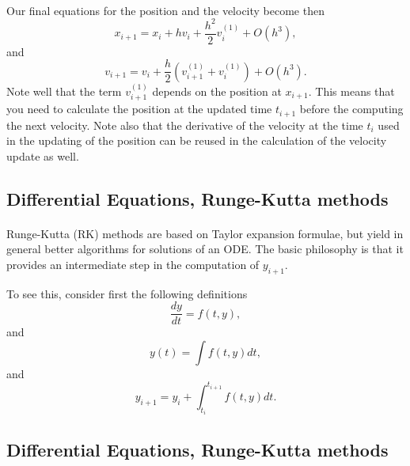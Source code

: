 \documentclass[%
oneside,                 %
final,                   %
10pt]{article}
\begin{document}
\paragraph{}
Our final equations for the position and the velocity become then 
\[
x_{i+1} = x_i+hv_i+\frac{h^2}{2}v^{(1)}_{i}+O(h^3),
\]
and
\[
v_{i+1} = v_i+\frac{h}{2}\left( v^{(1)}_{i+1}+v^{(1)}_{i}\right)+O(h^3). 
\]
Note well that the term $v^{(1)}_{i+1}$ depends on the position at $x_{i+1}$. This means that you need to calculate 
the position at the updated time $t_{i+1}$ before the computing the next velocity.  Note also that the derivative of the velocity at the time
$t_i$ used in the updating of the position can be reused in the calculation of the velocity update as well.







\subsection{Differential Equations, Runge-Kutta methods}

\paragraph{}
Runge-Kutta (RK) methods are based on Taylor expansion formulae, but yield
in general better algorithms for solutions of an ODE.
The basic philosophy is that it provides an intermediate step in the computation of $y_{i+1}$.

To see this, consider first the following definitions
\begin{equation}
   \frac{dy}{dt}=f(t,y),  
\end{equation} 
and 
\begin{equation}
   y(t)=\int f(t,y) dt,  
\end{equation} 
and 
\begin{equation}
  y_{i+1}=y_i+ \int_{t_i}^{t_{i+1}} f(t,y) dt.
\end{equation}



\subsection{Differential Equations, Runge-Kutta methods}

\end{document}
